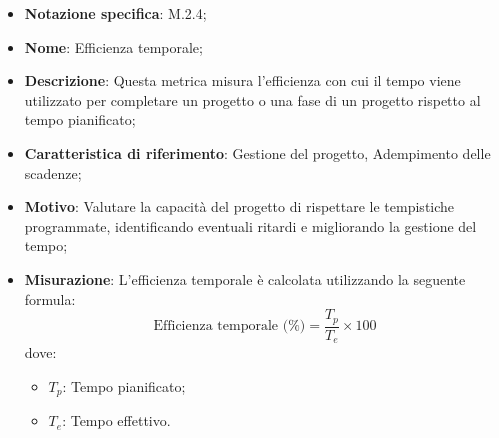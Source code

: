 \begin{itemize}
    \item \textbf{Notazione specifica}: M.2.4;
    \item \textbf{Nome}: Efficienza temporale;
    \item \textbf{Descrizione}: Questa metrica misura l'efficienza con cui il tempo viene utilizzato per completare un progetto o una fase di un progetto rispetto al tempo pianificato;
    \item \textbf{Caratteristica di riferimento}: Gestione del progetto, Adempimento delle scadenze;
    \item \textbf{Motivo}: Valutare la capacità del progetto di rispettare le tempistiche programmate, identificando eventuali ritardi e migliorando la gestione del tempo;
    \item \textbf{Misurazione}: L'efficienza temporale è calcolata utilizzando la seguente formula:
    \[
        \text{Efficienza temporale (\%)} =\frac{T_p}{T_e} \times 100
    \]
    dove:
    \begin{itemize}
        \item $T_{p}$: Tempo pianificato;
        \item $T_{e}$: Tempo effettivo.
    \end{itemize}
\end{itemize}
